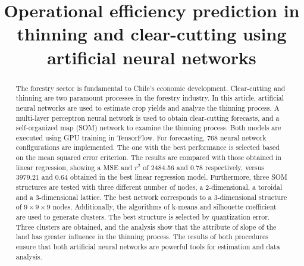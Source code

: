 \documentclass[conference]{IEEEtran}
\begin{document}
\title{Operational efficiency prediction in thinning and clear-cutting using artificial neural networks\\
}

\author{
\and
{}
}

\maketitle

\begin{abstract} 
The forestry sector is fundamental to Chile's economic development. Clear-cutting and thinning are two paramount processes in the forestry industry. In this article, artificial neural networks are used to estimate crop yields and analyze the thinning process. A multi-layer perceptron neural network is used to obtain clear-cutting forecasts, and a self-organized map (SOM) network to examine the thinning process. Both models are executed using GPU training in TensorFlow. For forecasting, 768 neural network configurations are implemented. The one with the best performance is selected based on the mean squared error criterion. The results are compared with those obtained in linear regression, showing a MSE and $r^2$ of 2484.56 and 0.78 respectively, versus 3979.21 and 0.64 obtained in the best linear regression model. Furthermore, three SOM structures are tested with three different number of nodes, a 2-dimensional, a toroidal and a 3-dimensional lattice. The best network corresponds to a 3-dimensional structure of $9\times9\times9$ nodes. Additionally, the algorithms of k-means and silhouette coefficient are used to generate clusters. The best structure is selected by quantization error. Three clusters are obtained, and the analysis show that the attribute of slope of the land has greater influence in the thinning process. The results of both procedures ensure that both artificial neural networks are powerful tools for estimation and data analysis.
\end{abstract}
\end{document}
